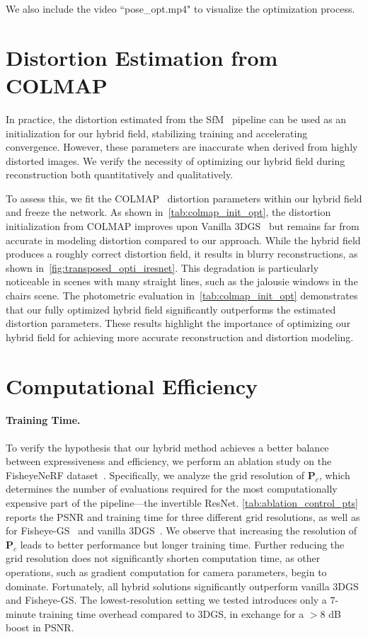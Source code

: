 We also include the video ``pose\_opt.mp4" to visualize the optimization process.


\section{Distortion Estimation from COLMAP}
\label{sec:inaccurate_colmap_distortion}
In practice, the distortion estimated from the SfM~\cite{schoenberger2016sfm} pipeline can be used as an initialization for our hybrid field, stabilizing training and accelerating convergence. However, these parameters are inaccurate when derived from highly distorted images. We verify the necessity of optimizing our hybrid field during reconstruction both quantitatively and qualitatively.

To assess this, we fit the COLMAP~\cite{schoenberger2016sfm} distortion parameters within our hybrid field and freeze the network. As shown in~\cref{tab:colmap_init_opt}, the distortion initialization from COLMAP improves upon Vanilla 3DGS~\cite{kerbl20233d} but remains far from accurate in modeling distortion compared to our approach. While the hybrid field produces a roughly correct distortion field, it results in blurry reconstructions, as shown in~\cref{fig:transposed_opti_iresnet}. This degradation is particularly noticeable in scenes with many straight lines, such as the jalousie windows in the chairs scene. The photometric evaluation in~\cref{tab:colmap_init_opt} demonstrates that our fully optimized hybrid field significantly outperforms the estimated distortion parameters. These results highlight the importance of optimizing our hybrid field for achieving more accurate reconstruction and distortion modeling.

\section{Computational Efficiency}
\paragraph{Training Time.}
To verify the hypothesis that our hybrid method achieves a better balance between expressiveness and efficiency, we perform an ablation study on the FisheyeNeRF dataset~\cite{jeong2021self}. 
Specifically, we analyze the grid resolution of $\textbf{P}_c$, which determines the number of evaluations required for the most computationally expensive part of the pipeline—the invertible ResNet. 
\cref{tab:ablation_control_pts} reports the PSNR and training time for three different grid resolutions, as well as for Fisheye-GS~\cite{liao2024fisheye} and vanilla 3DGS~\cite{kerbl20233d}. 
We observe that increasing the resolution of $\textbf{P}_c$ leads to better performance but longer training time. Further reducing the grid resolution does not significantly shorten computation time, as other operations, such as gradient computation for camera parameters, begin to dominate. Fortunately, all hybrid solutions significantly outperform vanilla 3DGS and Fisheye-GS. The lowest-resolution setting we tested introduces only a $7$-minute training time overhead compared to 3DGS, in exchange for a $>8$ dB boost in PSNR.


